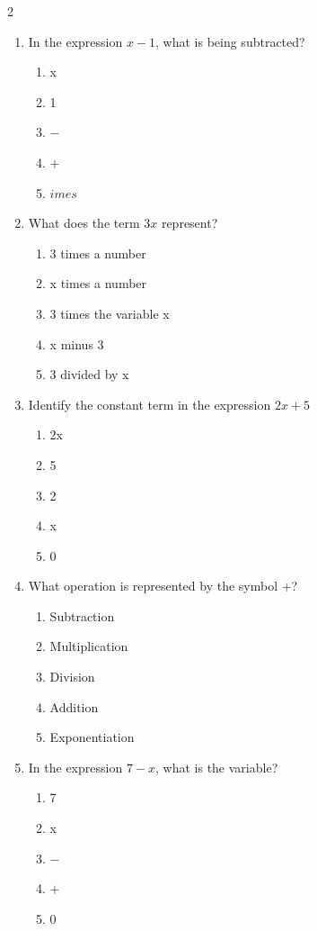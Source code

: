 \documentclass[10pt]{article}
\begin{document}
\begin{multicols}{2}
\begin{enumerate}[label=\textbf{Q\arabic*.}, leftmargin=*, itemsep=6pt, parsep=0pt]
  \item \small In the expression $x - 1$, what is being subtracted?
  \begin{enumerate}[label=(\Alph*), leftmargin=0.6cm, nosep, itemsep=2pt]
    \item x
    \item 1
    \item $-$
    \item $+$
    \item $	imes$
  \end{enumerate}

  \item \small What does the term $3x$ represent?
  \begin{enumerate}[label=(\Alph*), leftmargin=0.6cm, nosep, itemsep=2pt]
    \item 3 times a number
    \item x times a number
    \item 3 times the variable x
    \item x minus 3
    \item 3 divided by x
  \end{enumerate}

  \item \small Identify the constant term in the expression $2x + 5$
  \begin{enumerate}[label=(\Alph*), leftmargin=0.6cm, nosep, itemsep=2pt]
    \item 2x
    \item 5
    \item 2
    \item x
    \item 0
  \end{enumerate}

  \item \small What operation is represented by the symbol $+$?
  \begin{enumerate}[label=(\Alph*), leftmargin=0.6cm, nosep, itemsep=2pt]
    \item Subtraction
    \item Multiplication
    \item Division
    \item Addition
    \item Exponentiation
  \end{enumerate}

  \item \small In the expression $7 - x$, what is the variable?
  \begin{enumerate}[label=(\Alph*), leftmargin=0.6cm, nosep, itemsep=2pt]
    \item 7
    \item x
    \item $-$
    \item $+$
    \item 0
  \end{enumerate}

\end{enumerate}
\end{multicols}
\end{document}

